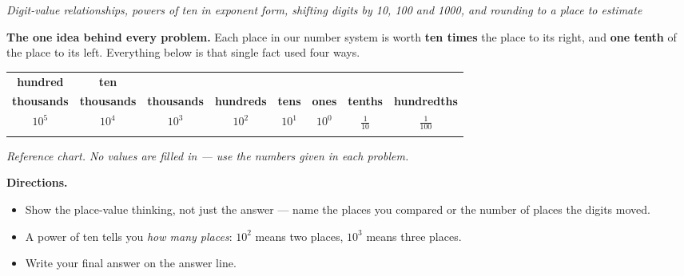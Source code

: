 \documentclass[12pt]{article}
\begin{document}

\begin{center}
\textit{Digit-value relationships, powers of ten in exponent form, shifting
digits by 10, 100 and 1000, and rounding to a place to estimate}
\end{center}

\noindent\textbf{The one idea behind every problem.} Each place in our number
system is worth \textbf{ten times} the place to its right, and \textbf{one
tenth} of the place to its left. Everything below is that single fact used four
ways.

\begin{center}\small
\begin{tabular}{|c|c|c|c|c|c|c|c|}
\hline
\textbf{hundred} & \textbf{ten} & & & & & & \\
\textbf{thousands} & \textbf{thousands} & \textbf{thousands} & \textbf{hundreds}
& \textbf{tens} & \textbf{ones} & \textbf{tenths} & \textbf{hundredths} \\
\hline
$10^5$ & $10^4$ & $10^3$ & $10^2$ & $10^1$ & $10^0$ & $\frac{1}{10}$ & $\frac{1}{100}$ \\
\hline
 & & & & & & & \\[0.6cm]
\hline
\end{tabular}

\small\textit{Reference chart. No values are filled in --- use the numbers given
in each problem.}\normalsize
\end{center}

\noindent\textbf{Directions.}
\begin{itemize}[leftmargin=1.2cm, itemsep=2pt, topsep=2pt]
\item Show the place-value thinking, not just the answer --- name the places you
compared or the number of places the digits moved.
\item A power of ten tells you \emph{how many places}: $10^2$ means two places,
$10^3$ means three places.
\item Write your final answer on the answer line.
\end{itemize}

\end{document}
